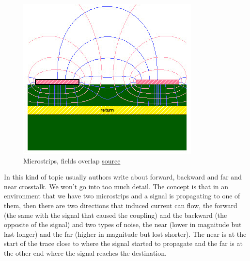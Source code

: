 \documentclass[12pt]{article}
\begin{document}
\begin{figure}[h!]
	\centering
	\includegraphics[keepaspectratio, height=.3\textheight, width = \textwidth]{assets/fringe_fields.png}
	\caption{Microstrips, fields overlap \href{https://www.signalintegrityjournal.com/blogs/4-eric-bogatin-signal-integrity-journal-technical-editor/post/402-pop-quiz-use-tight-or-loosely-coupled-differential-pairs-to-reduce-cross-talk}{source}}
\end{figure}


In this kind of topic usually authors write about forward, backward and far and near crosstalk. We won't go into too much detail. The concept is that in an environment that we have two microstrips and a signal is propagating to one of them, then there are two directions that induced current can flow, the forward (the same with the signal that caused the coupling) and the backward (the opposite of the signal) and two types of noise, the near (lower in magnitude but last longer) and the far (higher in magnitude but lost shorter). The near is at the start of the trace close to where the signal started to propagate  and the far is at the other end where the signal reaches the destination.
\end{document}

